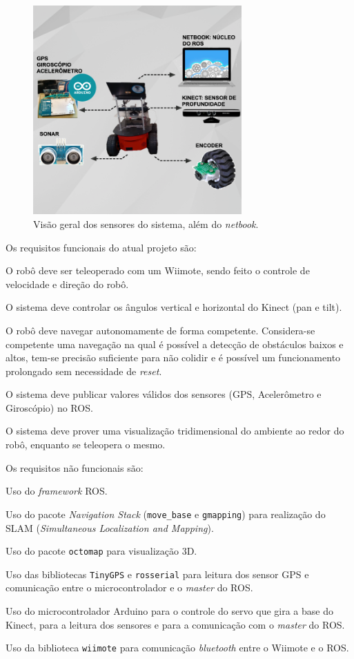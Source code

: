\begin{figure}[H]
\centering
  \includegraphics[width=8cm]{images/visaoGeral1.png}
\caption{\small{Visão geral dos sensores do sistema, além do \textit{netbook}.}}
\label{fig:visaoGeral1}
\end{figure} 


Os requisitos funcionais do atual projeto são:
\begin{compactenum}
  \item O robô deve ser teleoperado com um Wiimote, sendo feito o controle de velocidade e direção do robô.
  \item O sistema deve controlar os ângulos vertical e horizontal do Kinect (pan e tilt).
  \item O robô deve navegar autonomamente de forma competente. Considera-se competente uma navegação na qual é possível a detecção de obstáculos baixos e altos, tem-se precisão suficiente para não colidir e é possível um funcionamento prolongado sem necessidade de \textit{reset}.
  \item O sistema deve publicar valores válidos dos sensores (GPS, Acelerômetro e Giroscópio) no ROS.
  \item O sistema deve prover uma visualização tridimensional do ambiente ao redor do robô, enquanto se teleopera o mesmo.
  \end{compactenum}


Os requisitos não funcionais são:
\begin{compactenum}
  \item Uso do \textit{framework} ROS.
  \item Uso do pacote \textit{Navigation Stack} (\verb|move_base| e \verb|gmapping|) para realização do SLAM (\textit{Simultaneous Localization and Mapping}).
  \item Uso do pacote \verb|octomap| para visualização 3D.
  \item Uso das bibliotecas \verb|TinyGPS| e \verb|rosserial| para leitura dos sensor GPS e comunicação entre o microcontrolador e o \textit{master} do ROS.
  \item Uso do microcontrolador Arduino para o controle do servo que gira a base do Kinect, para a leitura dos sensores e para a comunicação com o \textit{master} do ROS.
  \item Uso da biblioteca \verb|wiimote| para comunicação \textit{bluetooth} entre o Wiimote e o ROS.
\end{compactenum}
